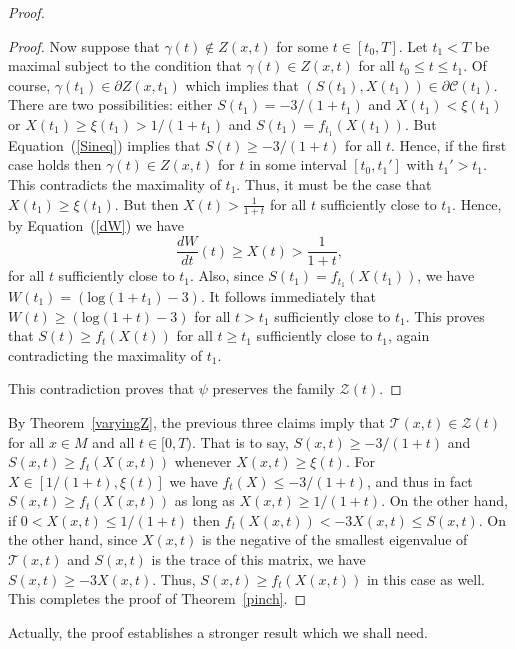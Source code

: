 \begin{proof}
\begin{proof}
Now suppose that $\gamma(t)\not\in Z(x,t)$ for some $t\in [t_0,T]$.
Let $t_1<T$ be maximal subject to the condition that $\gamma(t)\in
Z(x,t)$ for all $t_0\le t\le t_1$. Of course, $\gamma(t_1)\in
\partial Z(x,t_1)$ which implies that $(S(t_1),X(t_1))\in \partial
{\mathcal C}(t_1)$. There are two possibilities: either
$S(t_1)=-3/(1+t_1)$ and $X(t_1)<\xi(t_1)$ or $X(t_1)\ge
\xi(t_1)>1/(1+t_1)$  and $S(t_1)=f_{t_1}(X(t_1))$. But
Equation~(\ref{Sineq}) implies that $S(t)\ge -3/(1+t)$ for all $t$.
Hence, if the first case holds then $\gamma(t)\in Z(x,t)$ for $t$ in
some interval $[t_0,t_1']$ with $t_1'>t_1$. This contradicts the
maximality of $t_1$. Thus, it must be the case that $X(t_1)\ge
\xi(t_1)$. But then $X(t)> \frac{1}{1+t}$ for all $t$ sufficiently
close to $t_1$. Hence, by Equation~(\ref{dW}) we have
\[ \frac{dW}{dt}(t)\geq X(t)>\frac{1}{1+t}, \]
for all $t$ sufficiently close to $t_1$. Also, since
$S(t_1)=f_{t_1}(X(t_1))$, we have $W(t_1)=(\mathrm{log}(1+t_1)-3)$. It
follows immediately that $W(t)\ge (\mathrm{log}(1+t)-3)$ for all
$t>t_1$ sufficiently close to $t_1$. This proves that $S(t)\ge
f_t(X(t))$ for all $t\ge t_1$ sufficiently close to $t_1$, again
contradicting the maximality of $t_1$.

This contradiction proves that $\psi$ preserves the family
${\mathcal Z}(t)$.
\end{proof}

By Theorem~\ref{varyingZ}, the previous three claims imply that ${\mathcal
T}(x,t)\in {\mathcal Z}(t)$ for all $x\in M$ and all $t\in [0,T)$. That is to
say, $S(x,t)\ge -3/(1+t)$ and $S(x,t)\ge f_t(X(x,t))$ whenever $X(x,t)\ge
\xi(t)$. For $X\in [1/(1+t),\xi(t)]$ we have $f_t(X)\le -3/(1+t)$, and thus in
fact $S(x,t)\ge f_t(X(x,t))$ as long as $X(x,t)\ge 1/(1+t)$. On the other hand,
if $0< X(x,t)\le 1/(1+t)$ then $f_t(X(x,t))< -3X(x,t)\le S(x,t)$. On the other
hand, since $X(x,t)$ is the negative of the smallest eigenvalue of ${\mathcal
T}(x,t)$ and $S(x,t)$ is the trace of this matrix, we have $S(x,t)\ge
-3X(x,t)$. Thus, $S(x,t)\ge f_t(X(x,t))$ in this case as well. This completes
the proof of Theorem~\ref{pinch}.
\end{proof}

Actually, the proof establishes a stronger result which we shall
need.

